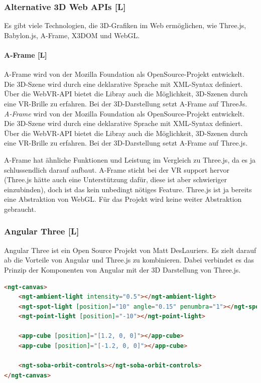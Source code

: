 \subsubsection{Alternative 3D Web APIs [L]}
Es gibt viele Technologien, die 3D-Grafiken im Web ermöglichen, wie Three.js, Babylon.js, A-Frame, X3DOM und WebGL.

\paragraph{A-Frame [L]}
A-Frame wird von der Mozilla Foundation als OpenSource-Projekt entwickelt. Die 3D-Szene wird durch eine deklarative Sprache mit XML-Syntax definiert. Über die WebVR-API bietet die Libray auch die Möglichkeit, 3D-Szenen durch eine VR-Brille zu erfahren. Bei der 3D-Darstellung setzt A-Frame auf ThreeJs. \cite[A-Frame Wikipedia]{a-frame-wiki}
\emph{A-Frame} wird von der Mozilla Foundation als OpenSource-Projekt entwickelt. Die 3D-Szene wird durch eine deklarative Sprache mit XML-Syntax definiert. Über die WebVR-API bietet die Libray auch die Möglichkeit, 3D-Szenen durch eine VR-Brille zu erfahren. Bei der 3D-Darstellung setzt A-Frame auf Three.js. \cite[A-Frame Wikipedia]{a-frame-wiki}

A-Frame hat ähnliche Funktionen und Leistung im Vergleich zu Three.js, da es ja schlussendlich darauf aufbaut. A-Frame sticht bei der VR support hervor (Three.js hätte auch eine Unterstützung dafür, diese ist aber schwieriger einzubinden), doch ist das kein unbedingt nötiges Feature. Three.js ist ja bereits eine Abstraktion von WebGL. Für das Projekt wird keine weiter Abstraktion gebraucht.

\subsubsection{Angular Three [L]}
\label{ch:Technologien:AngularThree}
Angular Three ist ein Open Source Projekt von Matt DesLauriers. Es zielt darauf ab die Vorteile von Angular und Three.js zu kombinieren. Dabei verbindet es das Prinzip der Komponenten von Angular mit der 3D Darstellung von Three.js. 

\begin{lstlisting}[language=html,caption=Angular Three - Komponentenbasiertes 3D Scenen in HTML,label=lst:impl:AngularThreeExampleCode]
<ngt-canvas>
    <ngt-ambient-light intensity="0.5"></ngt-ambient-light>
    <ngt-spot-light [position]="10" angle="0.15" penumbra="1"></ngt-spot-light>
    <ngt-point-light [position]="-10"></ngt-point-light>
  
    <app-cube [position]="[1.2, 0, 0]"></app-cube>
    <app-cube [position]="[-1.2, 0, 0]"></app-cube>
  
    <ngt-soba-orbit-controls></ngt-soba-orbit-controls>
</ngt-canvas>
\end{lstlisting}

